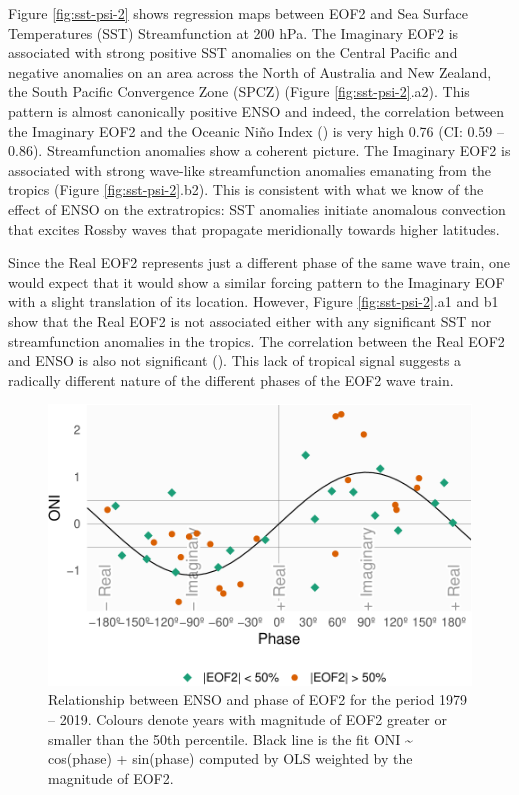\documentclass[smallextended]{svjour3}       %
\begin{document}
Figure \ref{fig:sst-psi-2} shows regression maps between EOF2 and Sea Surface Temperatures (SST) Streamfunction at 200 hPa. The Imaginary EOF2 is associated with strong positive SST anomalies on the Central Pacific and negative anomalies on an area across the North of Australia and New Zealand, the South Pacific Convergence Zone (SPCZ) (Figure \ref{fig:sst-psi-2}.a2). This pattern is almost canonically positive ENSO and indeed, the correlation between the Imaginary EOF2 and the Oceanic Niño Index (\citep{bamston1997}) is very high 0.76 (CI: 0.59 -- 0.86). Streamfunction anomalies show a coherent picture. The Imaginary EOF2 is associated with strong wave-like streamfunction anomalies emanating from the tropics (Figure \ref{fig:sst-psi-2}.b2). This is consistent with what we know of the effect of ENSO on the extratropics: SST anomalies initiate anomalous convection that excites Rossby waves that propagate meridionally towards higher latitudes.

Since the Real EOF2 represents just a different phase of the same wave train, one would expect that it would show a similar forcing pattern to the Imaginary EOF with a slight translation of its location. However, Figure \ref{fig:sst-psi-2}.a1 and b1 show that the Real EOF2 is not associated either with any significant SST nor streamfunction anomalies in the tropics. The correlation between the Real EOF2 and ENSO is also not significant (). This lack of tropical signal suggests a radically different nature of the different phases of the EOF2 wave train.

\begin{figure}
\centering
\includegraphics{../figures/enso-phase-1.pdf}
\caption{\label{fig:enso-phase}Relationship between ENSO and phase of EOF2 for the period 1979 -- 2019. Colours denote years with magnitude of EOF2 greater or smaller than the 50th percentile. Black line is the fit ONI \textasciitilde{} cos(phase) + sin(phase) computed by OLS weighted by the magnitude of EOF2.}
\end{figure}
\end{document}
